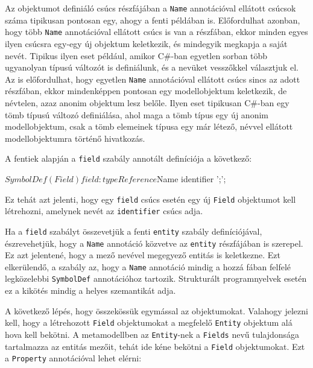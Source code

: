 \documentclass[12pt, a4paper]{report}
\newcommand{\f}[1]{\texttt{#1}}
\begin{document}
Az objektumot definiáló csúcs részfájában a \f{Name} annotációval ellátott csúcsok száma tipikusan pontosan egy, ahogy a fenti példában is. Előfordulhat azonban, hogy több \f{Name} annotációval ellátott csúcs is van a részfában, ekkor minden egyes ilyen csúcsra egy-egy új objektum keletkezik, és mindegyik megkapja a saját nevét. Tipikus ilyen eset például, amikor C\#-ban egyetlen sorban több ugyanolyan típusú változót is definiálunk, és a nevüket vesszőkkel választjuk el. Az is előfordulhat, hogy egyetlen \f{Name} annotációval ellátott csúcs sincs az adott részfában, ekkor mindenképpen pontosan egy modellobjektum keletkezik, de névtelen, azaz anonim objektum lesz belőle. Ilyen eset tipikusan C\#-ban egy tömb típusú változó definiálása, ahol maga a tömb típus egy új anonim modellobjektum, csak a tömb elemeinek típusa egy már létező, névvel ellátott modellobjektumra történő hivatkozás.

A fentiek alapján a \f{field} szabály annotált definíciója a következő:
\begin{antlr4code}
$SymbolDef(Field)
field: typeReference $Name identifier ';';
\end{antlr4code}

Ez tehát azt jelenti, hogy egy \f{field} csúcs esetén egy új \f{Field} objektumot kell létrehozni, amelynek nevét az \f{identifier} csúcs adja.

Ha a \f{field} szabályt összevetjük a fenti \f{entity} szabály definíciójával, észrevehetjük, hogy a \f{Name} annotáció közvetve az \f{entity} részfájában is szerepel. Ez azt jelentené, hogy a mező nevével megegyező entitás is keletkezne. Ezt elkerülendő, a szabály az, hogy a \f{Name} annotáció mindig a hozzá fában felfelé legközelebbi \f{SymbolDef} annotációhoz tartozik. Strukturált programnyelvek esetén ez a kikötés mindig a helyes szemantikát adja.

A következő lépés, hogy összekössük egymással az objektumokat. Valahogy jelezni kell, hogy a létrehozott \f{Field} objektumokat a megfelelő \f{Entity} objektum alá hova kell bekötni. A metamodellben az \f{Entity}-nek a \f{Fields} nevű tulajdonsága tartalmazza az entitás mezőit, tehát ide kéne bekötni a \f{Field} objektumokat. Ezt a \f{Property} annotációval lehet elérni:

\end{document}
